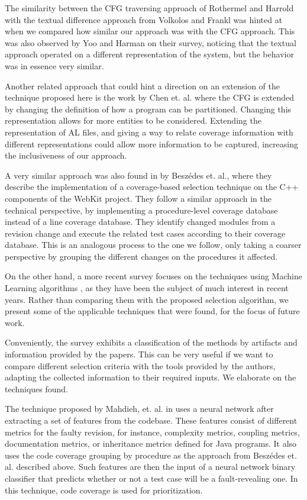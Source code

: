 \documentclass{article}
\begin{document}
The similarity between the CFG traversing approach of Rothermel and Harrold with the textual difference approach from Volkolos and Frankl was hinted at when we compared how similar our approach was with the CFG approach. This was also observed by Yoo and Harman on their survey, noticing that the textual approach operated on a different representation of the system, but the behavior was in essence very similar.

Another related approach that could hint a direction on an extension of the technique proposed here is the work by Chen et. al. \cite{chen} where the CFG is extended by changing the definition of how a program can be partitioned. Changing this representation allows for more entities to be considered. Extending the representation of AL files, and giving a way to relate coverage information with different representations could allow more information to be captured, increasing the inclusiveness of our approach.

A very similar approach was also found in \cite{6405252} by Beszédes et. al., where they describe the implementation of a coverage-based selection technique on the C++ components of the WebKit project. They follow a similar approach in the technical perspective, by implementing a procedure-level coverage database instead of a line coverage database. They identify changed modules from a revision change and execute the related test cases according to their coverage database. This is an analogous process to the one we follow, only taking a coarser perspective by grouping the different changes on the procedures it affected.

On the other hand, a more recent survey focuses on the techniques using Machine Learning algorithms \cite{Pan2021TestCS}, as they have been the subject of much interest in recent years. Rather than comparing them with the proposed selection algorithm, we present some of the applicable techniques that were found, for the focus of future work.

Conveniently, the survey exhibits a classification of the methods by artifacts and information provided by the papers\cite{MAHDIEH2020106269}\cite{10.1109/ICSE.2019.00055}\cite{10.1145/3180155.3180210}. This can be very useful if we want to compare different selection criteria with the tools provided by the authors, adapting the collected information to their required inputs. We elaborate on the techniques found.

The technique proposed by Mahdieh, et. al. in \cite{MAHDIEH2020106269} uses a neural network after extracting a set of features from the codebase. These features consist of different metrics for the faulty revision, for instance, complexity metrics, coupling metrics, documentation metrics, or inheritance metrics defined for Java programs. It also uses the code coverage grouping by procedure as the approach from Beszédes et. al. described above. Such features are then the input of a neural network binary classifier that predicts whether or not a test case will be a fault-revealing one. In this technique, code coverage is used for prioritization.
\end{document}

